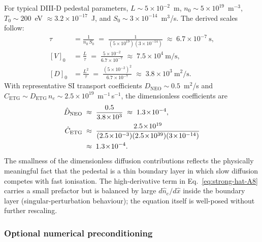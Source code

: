 \documentclass[twocolumn,secnumarabic,amssymb, nobibnotes, aps, prd]{revtex4-2}
\renewcommand{\ne}{n_{e}}  %
\begin{document}
For typical DIII-D pedestal parameters,
$L \!\sim\! 5\!\times\!10^{-2}$~m,
$n_{0} \!\sim\! 5\!\times\!10^{19}$~m$^{-3}$,
$T_{0} \!\sim\! 200$~eV $\!\approx\! 3.2\!\times\!10^{-17}$~J, and
$S_{0} \!\sim\! 3\!\times\!10^{-14}$~m$^{3}$/s. The derived scales
follow:
\begin{align}
  \tau    &= \frac{1}{n_{0}\,S_{0}}
            \;=\; \frac{1}{(5\!\times\!10^{19})(3\!\times\!10^{-14})}
            \;\approx\; 6.7\!\times\!10^{-7}~\text{s},
  \\
  [V]_{0} &= \frac{L}{\tau}
            \;=\; \frac{5\!\times\!10^{-2}}{6.7\!\times\!10^{-7}}
            \;\approx\; 7.5\!\times\!10^{4}~\text{m/s},
  \\
  [D]_{0} &= \frac{L^{2}}{\tau}
            \;=\; \frac{(5\!\times\!10^{-2})^{2}}{6.7\!\times\!10^{-7}}
            \;\approx\; 3.8\!\times\!10^{3}~\text{m}^{2}/\text{s}.
\end{align}
With representative SI transport coefficients
$D_{\mathrm{NEO}} \!\sim\! 0.5$~m$^{2}$/s and
$C_{\mathrm{ETG}} \!\sim\! D_{\mathrm{ETG}}\,\ne \!\sim\! 2.5\!\times\!10^{19}$~m$^{-1}$\,s$^{-1}$,
the dimensionless coefficients are
\begin{align}
  \hat{D}_{\mathrm{NEO}}
  &\;\approx\; \frac{0.5}{3.8\!\times\!10^{3}}
   \;\approx\; 1.3\!\times\!10^{-4},
  \\
  \hat{C}_{\mathrm{ETG}}
  &\;\approx\; \frac{2.5\!\times\!10^{19}}{(2.5\!\times\!10^{-3})(2.5\!\times\!10^{39})(3\!\times\!10^{-14})}
  \notag\\
  &\;\approx\; 1.3\!\times\!10^{-4}.
\end{align}
The smallness of the dimensionless diffusion contributions reflects
the physically meaningful fact that the pedestal is a thin boundary
layer in which slow diffusion competes with fast ionisation. The
high-derivative term in Eq.~\eqref{eq:strong-hat-A8} carries a small
prefactor but is balanced by large $d\hat{n}_{e}/d\hat{x}$ inside the
boundary layer (singular-perturbation behaviour); the equation itself
is well-posed without further rescaling.

\subsubsection{Optional numerical preconditioning}
\label{sec:precond-A8}
\end{document}
